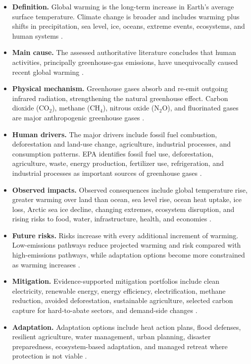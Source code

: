\documentclass[12pt]{article}
\begin{document}
\begin{itemize}[leftmargin=1.5em]
    \item \textbf{Definition.} Global warming is the long-term increase in Earth's average surface temperature. Climate change is broader and includes warming plus shifts in precipitation, sea level, ice, oceans, extreme events, ecosystems, and human systems \cite{ref2}.
    \item \textbf{Main cause.} The assessed authoritative literature concludes that human activities, principally greenhouse-gas emissions, have unequivocally caused recent global warming \cite{ref1,ref7}.
    \item \textbf{Physical mechanism.} Greenhouse gases absorb and re-emit outgoing infrared radiation, strengthening the natural greenhouse effect. Carbon dioxide (CO$_2$), methane (CH$_4$), nitrous oxide (N$_2$O), and fluorinated gases are major anthropogenic greenhouse gases \cite{ref3,ref4,ref5}.
    \item \textbf{Human drivers.} The major drivers include fossil fuel combustion, deforestation and land-use change, agriculture, industrial processes, and consumption patterns. EPA identifies fossil fuel use, deforestation, agriculture, waste, energy production, fertilizer use, refrigeration, and industrial processes as important sources of greenhouse gases \cite{ref4}.
    \item \textbf{Observed impacts.} Observed consequences include global temperature rise, greater warming over land than ocean, sea level rise, ocean heat uptake, ice loss, Arctic sea ice decline, changing extremes, ecosystem disruption, and rising risks to food, water, infrastructure, health, and economies \cite{ref1,ref6}.
    \item \textbf{Future risks.} Risks increase with every additional increment of warming. Low-emissions pathways reduce projected warming and risk compared with high-emissions pathways, while adaptation options become more constrained as warming increases \cite{ref1,ref7}.
    \item \textbf{Mitigation.} Evidence-supported mitigation portfolios include clean electricity, renewable energy, energy efficiency, electrification, methane reduction, avoided deforestation, sustainable agriculture, selected carbon capture for hard-to-abate sectors, and demand-side changes \cite{ref1,ref6}.
    \item \textbf{Adaptation.} Adaptation options include heat action plans, flood defenses, resilient agriculture, water management, urban planning, disaster preparedness, ecosystem-based adaptation, and managed retreat where protection is not viable \cite{ref1}.

\end{itemize}
\end{document}
